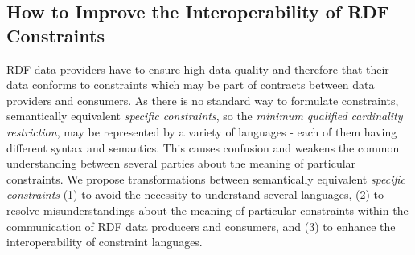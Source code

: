 \documentclass[a4paper,fontsize=11pt]{scrartcl}
\begin{document}
\subsection{How to Improve the Interoperability of RDF Constraints}
\label{sec:transformations}

RDF data providers have to ensure high data quality and therefore 
that their data conforms to constraints which may be part of contracts between data providers and consumers.
As there is no standard way to formulate constraints, 
semantically equivalent \emph{specific constraints}, so the \emph{minimum qualified cardinality restriction}, may be represented by a variety of languages - each of them having different syntax and semantics.
This causes confusion and weakens the common understanding between several parties about the meaning of particular constraints.
We propose transformations between semantically equivalent \emph{specific constraints}
(1) to avoid the necessity to understand several languages,
(2) to resolve misunderstandings about the meaning of particular constraints within the communication of RDF data producers and consumers, and
(3) to enhance the interoperability of constraint languages.
\end{document}
